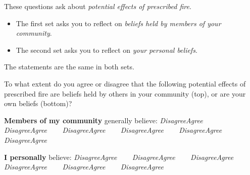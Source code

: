 \documentclass[
  english,
  checkmode = fill,
  ]{sdapsclassic}
\begin{document}
\begin{sloppypar}
\begin{questionnaire}
\vspace{2em} 

These questions ask about \emph{potential effects of prescribed fire}. 

\begin{itemize}
\item The first set asks you to reflect on \emph{beliefs held by members of your community}. 
\item The second set asks you to reflect on \emph{your personal beliefs}. 
\end{itemize}
The statements are the same in both sets.

 To what extent do you agree or disagree that the following potential effects of prescribed fire are beliefs held by others in your community (top), or are your own beliefs (bottom)?
    
    
      \begin{markgroup}{\textbf{Members of my community} generally believe:}
        {\emph{Disagree}}{\emph{Agree}~~} {}~{}
        {\emph{Disagree}}{\emph{Agree}~~} {}~{}
        {\emph{Disagree}}{\emph{Agree}~~} {}~{}
        {\emph{Disagree}}{\emph{Agree}~~} {}~{}
        {\emph{Disagree}}{\emph{Agree}~~} {}~{}
        {\emph{Disagree}}{\emph{Agree}~~} {}~{}
      \end{markgroup}
    
      \begin{markgroup}{\textbf{I personally} believe:}
        {\emph{Disagree}}{\emph{Agree}~~} {}~{}
        {\emph{Disagree}}{\emph{Agree}~~} {}~{}
        {\emph{Disagree}}{\emph{Agree}~~} {}~{}
        {\emph{Disagree}}{\emph{Agree}~~} {}~{}
        {\emph{Disagree}}{\emph{Agree}~~} {}~{}
        {\emph{Disagree}}{\emph{Agree}~~} {}~{}
      \end{markgroup}
    

\end{questionnaire}
\end{sloppypar}
\end{document}

